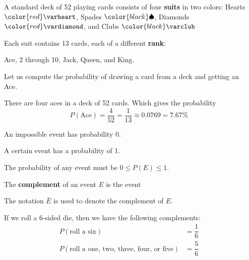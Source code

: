 \documentclass{beamer}
\newcommand{\suitheart}[1][]{{\color{red}\text{#1}\varheart}}
\newcommand{\suitspade}[1][]{{\color{black}\text{#1}\spadesuit}}
\newcommand{\suitdiamond}[1][]{{\color{red}\text{#1}\vardiamond}}
\newcommand{\suitclub}[1][]{{\color{black}\text{#1}\varclub}}
\newcommand{\prob}[1]{P\left(#1\right)}
\begin{document}
\begin{frame}
\begin{definition}
A standard deck of 52 playing cards consists of four \textbf{suits} in two colors: 
Hearts $\suitheart$, Spades $\suitspade$, Diamonds $\suitdiamond$, and Clubs $\suitclub$

\vspace{2mm}
Each suit contains 13 cards, each of a different \textbf{rank}: 

Ace, 2 through 10, Jack, Queen, and King.
\end{definition}\pause

\begin{example}
Let us compute the probability of drawing a card from a deck and getting an Ace.\pause

There are four aces in a deck of 52 cards. Which gives the probability
\begin{equation*}
\prob{\text{Ace}}=\dfrac{4}{52}=\dfrac{1}{13}\approx 0.0769=7.67\%
\end{equation*}
\end{example}
\end{frame}

\begin{frame}
\begin{definition}
An impossible event has probability 0.

\vspace{2mm}
A certain event has a probability of 1.

\vspace{2mm}
The probability of any event must be $0\leq\prob{E}\leq1$.
\end{definition}\pause

\begin{definition}
The \textbf{complement} of an event $E$ is the event 

\vspace{2mm}
The notation $\bar{E}$ is used to denote the complement of $E$.
\end{definition}\pause

\begin{example}
If we roll a 6-sided die, then we have the following complements:
\begin{equation*}
\begin{aligned}
\prob{\text{roll a six}} &= \dfrac{1}{6} \\
\prob{\text{roll a one, two, three, four, or five}} &= \dfrac{5}{6}
\end{aligned}
\end{equation*}
\end{example}
\end{frame}
\end{document}
